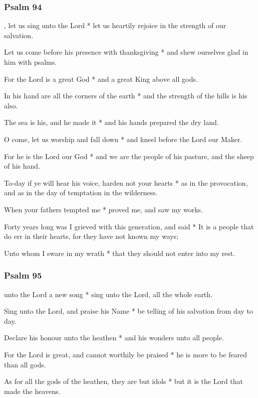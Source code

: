 \subsubsection{Psalm 94}


, let us sing unto the Lord * let us heartily rejoice in the strength of our salvation.

Let us come before his presence with thanksgiving * and shew ourselves glad in him with psalms.

For the Lord is a great God * and a great King above all gods.

In his hand are all the corners of the earth * and the strength of the hills is his also.

The sea is his, and he made it * and his hands prepared the dry land.

O come, let us worship and fall down * and kneel before the Lord our Maker.

For he is the Lord our God * and we are the people of his pasture, and the sheep of his hand.

To-day if ye will hear his voice, harden not your hearts * as in the provocation, and as in the day of temptation in the wilderness.

When your fathers tempted me * proved me, and saw my works.

Forty years long was I grieved with this generation, and said * It is a people that do err in their hearts, for they have not known my ways;

Unto whom I sware in my wrath * that they should not enter into my rest.

\subsubsection{Psalm 95}


 unto the Lord a new song * sing unto the Lord, all the whole earth.

Sing unto the Lord, and praise his Name * be telling of his salvation from day to day.

Declare his honour unto the heathen * and his wonders unto all people.

For the Lord is great, and cannot worthily be praised * he is more to be feared than all gods.

As for all the gods of the heathen, they are but idols * but it is the Lord that made the heavens.

